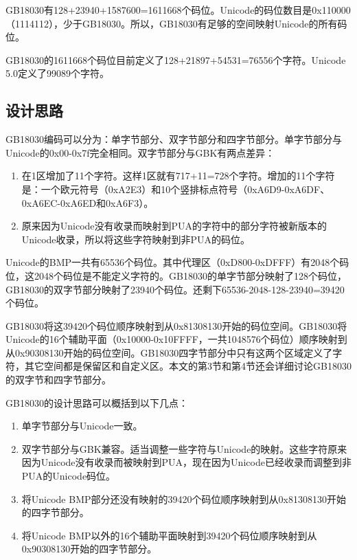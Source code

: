 \documentclass[cn,hazy,blue,14pt,screen]{elegantnote}
\begin{document}

GB18030有128+23940+1587600=1611668个码位。Unicode的码位数目是0x110000（1114112），少于GB18030。所以，GB18030有足够的空间映射Unicode的所有码位。

GB18030的1611668个码位目前定义了128+21897+54531=76556个字符。Unicode
5.0定义了99089个字符。

\hypertarget{ux8bbeux8ba1ux601dux8def}{%
\subsection{设计思路}\label{ux8bbeux8ba1ux601dux8def}}

GB18030编码可以分为：单字节部分、双字节部分和四字节部分。单字节部分与Unicode的0x00-0x7f完全相同。双字节部分与GBK有两点差异：

\begin{enumerate}

\item
  在1区增加了11个字符。这样1区就有717+11=728个字符。增加的11个字符是：一个欧元符号（0xA2E3）和10个竖排标点符号（0xA6D9-0xA6DF、0xA6EC-0xA6ED和0xA6F3）。
\item
  原来因为Unicode没有收录而映射到PUA的字符中的部分字符被新版本的Unicode收录，所以将这些字符映射到非PUA的码位。
\end{enumerate}

Unicode的BMP一共有65536个码位。其中代理区（0xD800-0xDFFF）有2048个码位，这2048个码位是不能定义字符的。GB18030的单字节部分映射了128个码位，GB18030的双字节部分映射了23940个码位。还剩下65536-2048-128-23940=39420个码位。

GB18030将这39420个码位顺序映射到从0x81308130开始的码位空间。GB18030将Unicode的16个辅助平面（0x10000-0x10FFFF，一共1048576个码位）顺序映射到从0x90308130开始的码位空间。GB18030四字节部分中只有这两个区域定义了字符，其它空间都是保留区和自定义区。本文的第3节和第4节还会详细讨论GB18030的双字节和四字节部分。

GB18030的设计思路可以概括到以下几点：

\begin{enumerate}

\item
  单字节部分与Unicode一致。
\item
  双字节部分与GBK兼容。适当调整一些字符与Unicode的映射。这些字符原来因为Unicode没有收录而被映射到PUA，现在因为Unicode已经收录而调整到非PUA的Unicode码位。
\item
  将Unicode
  BMP部分还没有映射的39420个码位顺序映射到从0x81308130开始的四字节部分。
\item
  将Unicode
  BMP以外的16个辅助平面映射到39420个码位顺序映射到从0x90308130开始的四字节部分。
\end{enumerate}
\end{document}
